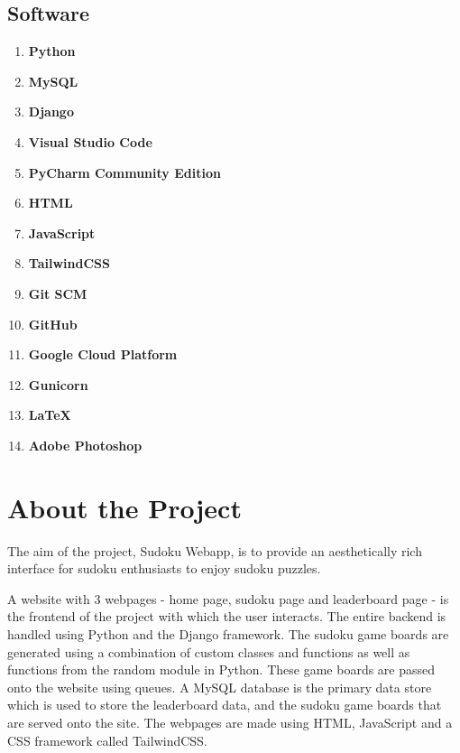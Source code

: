 \documentclass[12pt, a4paper]{report}
\begin{document}
    \subsection{Software}
    \begin{enumerate}
        \item \textbf{Python} \newline
        \item \textbf{MySQL} \newline
        \item \textbf{Django} \newline
        \item \textbf{Visual Studio Code} \newline
        \item \textbf{PyCharm Community Edition} \newline
        \item \textbf{HTML} \newline
        \item \textbf{JavaScript} \newline
        \item \textbf{TailwindCSS} \newline
        \item \textbf{Git SCM} \newline
        \item \textbf{GitHub} \newline
        \item \textbf{Google Cloud Platform} \newline
        \item \textbf{Gunicorn} \newline
        \item \textbf{\LaTeX} \newline
        \item \textbf{Adobe Photoshop} \newline
        
    \end{enumerate}
    
    
  \newpage
  \section{About the Project}
  The aim of the project, Sudoku Webapp, is to provide an aesthetically rich interface for sudoku enthusiasts to enjoy sudoku puzzles.\newline

  A website with 3 webpages - home page, sudoku page and leaderboard page - is the frontend of the project with which the user interacts. The entire backend is handled using Python and the Django framework. The sudoku game boards are generated using a combination of custom classes and functions as well as functions from the random module in Python. These game boards are passed onto the website using queues. A MySQL database is the primary data store which is used to store the leaderboard data, and the sudoku game boards that are served onto the site. The webpages are made using HTML, JavaScript and a CSS framework called TailwindCSS. \newline
\end{document}
